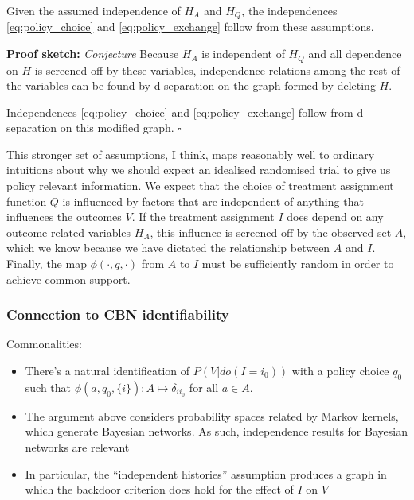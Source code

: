 \begin{center}
\end{center}

Given the assumed independence of $H_A$ and $H_Q$, the independences \ref{eq:policy_choice} and \ref{eq:policy_exchange} follow from these assumptions.

\textbf{Proof sketch: } \emph{Conjecture} Because $H_A$ is independent of $H_Q$ and all dependence on $H$ is screened off by these variables, independence relations among the rest of the variables can be found by d-separation on the graph formed by deleting $H$.

Independences \ref{eq:policy_choice} and \ref{eq:policy_exchange} follow from d-separation on this modified graph. $\square$

This stronger set of assumptions, I think, maps reasonably well to ordinary intuitions about why we should expect an idealised randomised trial to give us policy relevant information. We expect that the choice of treatment assignment function $Q$ is influenced by factors that are independent of anything that influences the outcomes $V$. If the treatment assignment $I$ does depend on any outcome-related variables $H_A$, this influence is screened off by the observed set $A$, which we know because we have dictated the relationship between $A$ and $I$. Finally, the map $\phi(\cdot,q,\cdot)$ from $A$ to $I$ must be sufficiently random in order to achieve common support. 

\subsubsection{Connection to CBN identifiability}

Commonalities:

\begin{itemize}
    \item There's a natural identification of $P(V|do(I=i_0))$ with a policy choice $q_0$ such that $\phi(a,q_0,\{i\}):A\mapsto \delta_{ii_0}$ for all $a\in A$.
    \item The argument above considers probability spaces related by Markov kernels, which generate Bayesian networks. As such, independence results for Bayesian networks are relevant
    \item In particular, the ``independent histories'' assumption produces a graph in which the backdoor criterion does hold for the effect of $I$ on $V$
\end{itemize}

